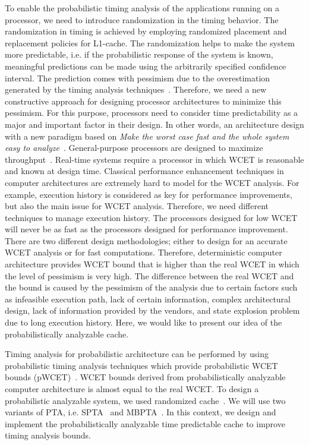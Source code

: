 To enable the probabilistic timing analysis of the applications running on a processor, we need to introduce randomization in the timing behavior. The randomization in timing is achieved by employing  randomized placement and replacement policies for L1-cache.  The randomization helps to make the system more predictable, i.e. if the probabilistic response of the system is known, meaningful predictions can be made using the arbitrarily specified confidence interval. The prediction comes with pessimism due to the overestimation generated by the timing analysis techniques~\cite{Cazorla:2013:PPA:2465787.2465796}. Therefore, we need a new constructive approach for designing processor architectures to minimize this pessimism. For this purpose, processors need to consider time predictability as a major and important factor in their design. In other words, an architecture design with a new paradigm based on \textit{Make the worst case fast and the whole system easy to analyze}~\cite{Schoeberl:2009:TCA:1540555.1554265}. General-purpose processors are designed to maximize throughput~\cite{Cazorla:2013:PPA:2465787.2465796}. Real-time systems require a processor in which WCET is reasonable and known at design time. Classical performance enhancement techniques in computer architectures are extremely hard to model for the WCET analysis. For example, execution history is considered as key for performance improvements, but also the main issue for WCET analysis. Therefore, we need different techniques to manage execution history. The processors designed for low WCET will never be as fast as the processors designed for performance improvement. There are two different design methodologies; either to design for an accurate WCET analysis or for fast computations.
Therefore, deterministic computer architecture provides WCET bound that is higher than the real WCET in which the level of pessimism is very high. The difference between the real WCET and the bound is caused by the pessimism of the analysis due to certain factors such as  infeasible execution path, lack of certain information, complex architectural design, lack of information provided by the vendors, and state explosion problem due to long execution history.  Here, we would like to present our idea of the probabilistically analyzable cache. 
 
Timing analysis for probabilistic architecture can be performed by using probabilistic timing analysis techniques which provide probabilistic WCET bounds (\small{p}WCET)~\cite{Cazorla:2013:PPA:2465787.2465796}. WCET bounds derived from probabilistically analyzable computer architecture is almost equal to the real WCET. 
To design a probabilistic analyzable system, we used randomized cache~\cite{anwar2015probabilistically}. 
 We will use two variants of PTA, i.e. SPTA~\cite{Altmeyer:2015:SPT:2726097.2726149} and MBPTA~\cite{cucu2012measurement}.
In this context, we design and implement the probabilistically analyzable time predictable cache to improve timing analysis bounds.
% 
